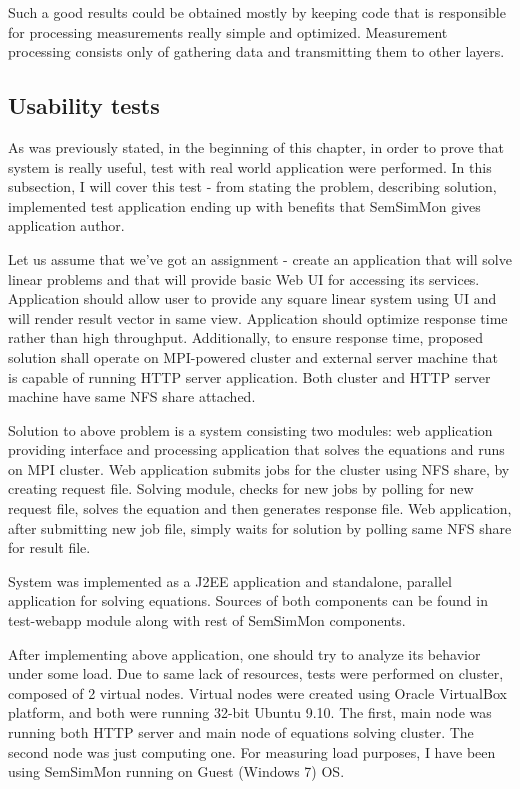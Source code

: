Such a good results could be obtained mostly by keeping code that is responsible for processing measurements really simple and optimized. Measurement processing consists only of gathering data and transmitting them to other layers.


\subsection{Usability tests}

As was previously stated, in the beginning of this chapter, in order to prove that system is really useful, test with real world application were performed. In this subsection, I will cover this test - from stating the problem, describing solution, implemented test application ending up with benefits that SemSimMon gives application author.

Let us assume that we\rq{}ve got an assignment - create an application that will solve linear problems and that will provide basic Web UI for accessing its services. Application should allow user to provide any square linear system using UI and will render result vector in same view. Application should optimize response time rather than high throughput. Additionally, to ensure response time, proposed solution shall operate on MPI-powered cluster and external server machine that is capable of running HTTP server application. Both cluster and HTTP server machine have same NFS share attached. 

Solution to above problem is a system consisting two modules: web application providing interface and processing application that solves the equations and runs on MPI cluster. Web application submits jobs for the cluster using NFS share, by creating request file. Solving module, checks for new jobs by polling for new request file, solves the equation and then generates response file. Web application, after submitting new job file, simply waits for solution by polling same NFS share for result file. 

System was implemented as a J2EE application and standalone, parallel application for solving equations. Sources of both components can be found in test-webapp module along with rest of SemSimMon components.

After implementing above application, one should try to analyze its behavior under some load. Due to same lack of resources, tests were performed on cluster, composed of 2 virtual nodes. Virtual nodes were created using Oracle VirtualBox platform, and both were running 32-bit Ubuntu 9.10. The first, main node was running both HTTP server and main node of equations solving cluster. The second node was just computing one. For measuring load purposes, I have been using SemSimMon running on Guest (Windows 7) OS. 


